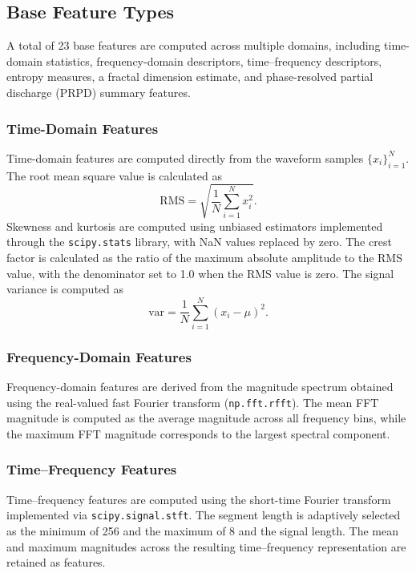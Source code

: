 \subsection{Base Feature Types}

A total of 23 base features are computed across multiple domains, including time-domain statistics, frequency-domain descriptors, time--frequency descriptors, entropy measures, a fractal dimension estimate, and phase-resolved partial discharge (\ac{PRPD}) summary features.

\subsubsection{Time-Domain Features}

Time-domain features are computed directly from the waveform samples $\{x_i\}_{i=1}^{N}$. The root mean square value is calculated as
\[
\mathrm{RMS} = \sqrt{\frac{1}{N}\sum_{i=1}^{N} x_i^2}.
\]
Skewness and kurtosis are computed using unbiased estimators implemented through the \texttt{scipy.stats} library, with NaN values replaced by zero. The crest factor is calculated as the ratio of the maximum absolute amplitude to the RMS value, with the denominator set to 1.0 when the RMS value is zero. The signal variance is computed as
\[
\mathrm{var} = \frac{1}{N}\sum_{i=1}^{N} (x_i - \mu)^2.
\]

\subsubsection{Frequency-Domain Features}

Frequency-domain features are derived from the magnitude spectrum obtained using the real-valued fast Fourier transform (\texttt{np.fft.rfft}). The mean FFT magnitude is computed as the average magnitude across all frequency bins, while the maximum FFT magnitude corresponds to the largest spectral component.

\subsubsection{Time--Frequency Features}

Time--frequency features are computed using the short-time Fourier transform implemented via \texttt{scipy.signal.stft}. The segment length is adaptively selected as the minimum of 256 and the maximum of 8 and the signal length. The mean and maximum magnitudes across the resulting time--frequency representation are retained as features.

